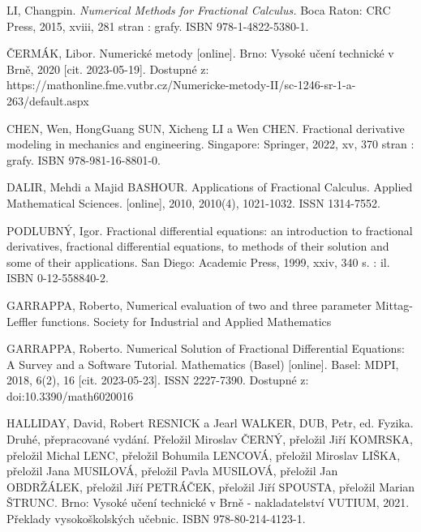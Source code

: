 \documentclass[a4paper,12pt,twoside]{article}
\theoremstyle{definition}
\theoremstyle{remark}
\numberwithin{equation}{section}
\numberwithin{table}{section}
\numberwithin{figure}{section}
\begin{document}
\newpage
\newpage
\begin{thebibliography}{12}
 LI, Changpin. {\em Numerical Methods for Fractional Calculus.} Boca Raton: CRC Press, 2015, xviii, 281 stran : grafy. ISBN 978-1-4822-5380-1.
	
 ČERMÁK, Libor. Numerické metody [online]. Brno: Vysoké učení technické v Brně, 2020 [cit. 2023-05-19]. Dostupné z: https://mathonline.fme.vutbr.cz/Numericke-metody-II/sc-1246-sr-1-a-263/default.aspx	
		

 CHEN, Wen, HongGuang SUN, Xicheng LI a Wen CHEN. Fractional derivative modeling in mechanics and engineering. Singapore: Springer, 2022, xv, 370 stran : grafy. ISBN 978-981-16-8801-0.

DALIR, Mehdi a Majid BASHOUR. Applications of Fractional Calculus. Applied Mathematical Sciences. [online], 2010, 2010(4), 1021-1032. ISSN 1314-7552.


PODLUBNÝ, Igor. Fractional differential equations: an introduction to fractional derivatives, fractional differential equations, to methods of their solution and some of their applications. San Diego: Academic Press, 1999, xxiv, 340 s. : il. ISBN 0-12-558840-2.

 GARRAPPA, Roberto, Numerical evaluation of two and three parameter Mittag-Leffler functions. Society for Industrial and Applied Mathematics

 GARRAPPA, Roberto. Numerical Solution of Fractional Differential Equations: A Survey and a Software Tutorial. Mathematics (Basel) [online]. Basel: MDPI, 2018, 6(2), 16 [cit. 2023-05-23]. ISSN 2227-7390. Dostupné z: doi:10.3390/math6020016

 HALLIDAY, David, Robert RESNICK a Jearl WALKER, DUB, Petr, ed. Fyzika. Druhé, přepracované vydání. Přeložil Miroslav ČERNÝ, přeložil Jiří KOMRSKA, přeložil Michal LENC, přeložil Bohumila LENCOVÁ, přeložil Miroslav LIŠKA, přeložil Jana MUSILOVÁ, přeložil Pavla MUSILOVÁ, přeložil Jan OBDRŽÁLEK, přeložil Jiří PETRÁČEK, přeložil Jiří SPOUSTA, přeložil Marian ŠTRUNC. Brno: Vysoké učení technické v Brně - nakladatelství VUTIUM, 2021. Překlady vysokoškolských učebnic. ISBN 978-80-214-4123-1.


\end{thebibliography}
\end{document}
